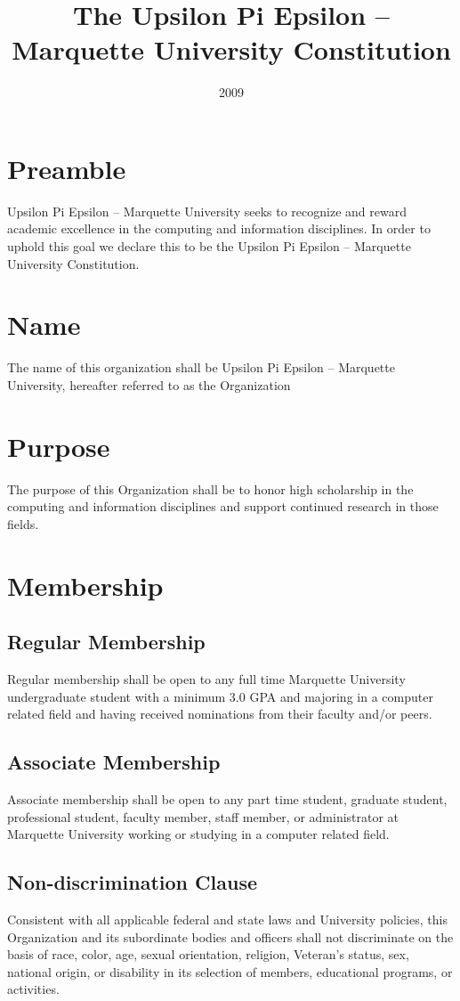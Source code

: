 \documentclass{article}
\title{The Upsilon Pi Epsilon – Marquette University Constitution}
\date{2009}
\begin{document}
\maketitle

\section*{Preamble}
Upsilon Pi Epsilon – Marquette University seeks to recognize and reward academic excellence in
the computing and information disciplines. In order to uphold this goal we declare this to be the
Upsilon Pi Epsilon – Marquette University Constitution.

\section{Name}
The name of this organization shall be Upsilon Pi Epsilon – Marquette University, hereafter
referred to as the Organization

\section{Purpose}
The purpose of this Organization shall be to honor high scholarship in the computing and information disciplines and support continued research in those fields.

\section{Membership}
\subsection{Regular Membership}
Regular membership shall be open to any full time Marquette University
undergraduate student with a minimum 3.0 GPA and majoring in a computer
related field and having received nominations from their faculty and/or peers.
\subsection{Associate Membership}
Associate membership shall be open to any part time student, graduate student,
professional student, faculty member, staff member, or administrator at
Marquette University working or studying in a computer related field.
\subsection{Non-discrimination Clause}
Consistent with all applicable federal and state laws and University policies, this Organization and its subordinate bodies and
officers shall not discriminate on the basis of race, color, age, sexual orientation, religion, Veteran’s status, sex, national origin, or disability in its selection of members, educational programs, or activities.
\end{document}

